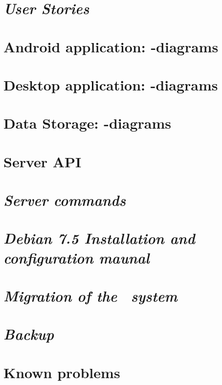 \begin{appendix}

\chapter{\textit{User Stories}}


\chapter{Android application: -diagrams}


\chapter{Desktop application: -diagrams}
\label{chap:des_appendix}
%

\chapter{Data Storage: -diagrams}
\label{chap:dat_umls}


\chapter{Server API}


\chapter{\textit{Server commands}}


%

\chapter{\textit{Debian 7.5 Installation and configuration maunal}}


\chapter{\textit{Migration of the \appName\ system}}


\chapter{\textit{Backup}}


\chapter{Known problems}
\label{chap:knownProblems}


\end{appendix}
